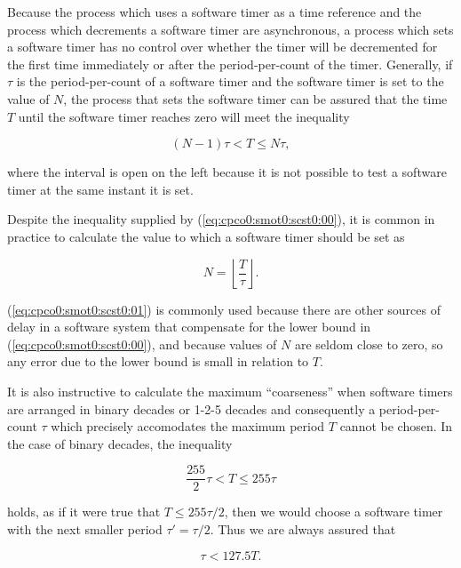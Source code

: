Because the process which uses a software timer as a time 
reference and the process which decrements a software timer
are asynchronous, a process which sets a software timer has no 
control over whether the timer will be decremented for the
first time immediately or after the period-per-count of the timer.
Generally, if $\tau$ is the period-per-count of a software timer and
the software timer is set to the value of $N$, the process that
sets the software timer can be assured that the time $T$ until the
software timer reaches zero will meet the inequality

\begin{equation}
\label{eq:cpco0:smot0:scst0:00}
(N-1) \tau < T \leq N \tau ,
\end{equation}

\noindent{}where the interval is open on the left because 
it is not possible to test a software timer at
the same instant it is set.

Despite the inequality supplied by 
(\ref{eq:cpco0:smot0:scst0:00}), it is common in practice to calculate
the value to which a software timer should be set as

\begin{equation}
\label{eq:cpco0:smot0:scst0:01}
N = \left\lfloor { \frac{T}{\tau} } \right\rfloor .
\end{equation}

(\ref{eq:cpco0:smot0:scst0:01}) is commonly used because there
are other sources of delay in a software system that compensate
for the lower bound in (\ref{eq:cpco0:smot0:scst0:00}), and because
values of $N$ are seldom close to zero, so any error due to the
lower bound is small in relation to $T$.

It is also instructive to calculate the maximum ``coarseness'' when 
software timers are arranged in binary decades or 1-2-5 decades
and consequently a period-per-count $\tau$ which precisely accomodates
the maximum period $T$ cannot be chosen.  In the case of binary decades,
the inequality

\begin{equation}
\label{eq:cpco0:smot0:scst0:02}
\frac{255}{2} \tau < T \leq 255 \tau
\end{equation}

\noindent{}holds, as if it were true that $T \leq 255 \tau /2$, 
then we would choose
a software timer with the next smaller period $\tau ' = \tau / 2$.
Thus we are always assured that

\begin{equation}
\label{eq:cpco0:smot0:scst0:03}
\tau < 127.5 T .
\end{equation}

